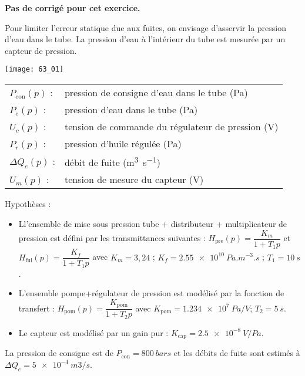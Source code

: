 \normaltrue \difficilefalse \tdifficilefalse
\correctionfalse

\setcounter{numques}{0}

\ifcorrection
\else
\textbf{Pas de corrigé pour cet exercice.}
\fi

\ifprof
\else

Pour limiter l’erreur statique due aux fuites, on envisage d’asservir la pression d’eau dans le tube. 
La pression d’eau à l’intérieur du tube est mesurée par un capteur de pression. 

\begin{center}
\texttt{[image: 63\_01]}
\end{center}

 
 \begin{tabular}{lp{5cm}}
$P_{\text{con}}(p)$ : & 	pression de consigne d’eau dans le tube (Pa) \\
$P_e(p)$ : & 	pression d’eau dans le tube (Pa) \\
$U_c(p)$ : & 	tension de commande du régulateur de pression (V)\\
$P_r(p)$ : &	pression d’huile régulée (Pa)\\
$\Delta Q_e(p)$ :& 	débit de fuite (\si{m^3s^{-1}})\\
$U_m(p)$ 	:&	tension de mesure du capteur (V)\\
\end{tabular}
 
 Hypothèses :
\begin{itemize}
\item Ll’ensemble de mise sous pression {tube + distributeur + multiplicateur de pression} est défini par les transmittances suivantes : $H_{\text{pre}} (p)=\dfrac{K_m}{1+T_1 p}$	et	$H_{\text{fui}} (p)=\dfrac{K_f}{1+T_1 p}$ avec 	$K_m = 3,24$ ; 	$K_f = \SI{2,55e10}{Pa.m^{-3}.s}$ ; 	$T_1  = \SI{10}{s}$.
\item L’ensemble {pompe+régulateur de pression} est modélisé par la fonction de transfert :
$H_{\text{pom}} (p)=\dfrac{K_{\text{pom}}}{1+T_2 p}$  avec 	$K_{\text{pom}} = \SI{1,234e7}{Pa/V}$; 	$T_2 = \SI{5}{s}$.
\item Le capteur est modélisé par un gain pur :	$K_{\text{cap}} = \SI{2,5e-8}{V/Pa}$.
\end{itemize}
La pression de consigne est de $P_{\text{con}} = \SI{800}{bars}$ et les débits de fuite sont estimés à $\Delta Q_e = \SI{5e-4}{m3/s}$.

